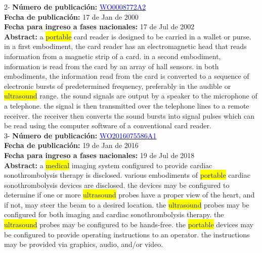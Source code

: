  \vspace{1cm}2- \textbf{Número de publicación:} \href{https://worldwide.espacenet.com/publicationDetails/biblio?DB=EPODOC&II=0&ND=3&adjacent=true&locale=en_EP&FT=D&date=20160331&CC=WO&NR=0008772A2&KC=#}{\textcolor{blue}{WO0008772A2}}\\ 
\textbf{Fecha de publicación:} 17 de Jan de 2000\\ 
\textbf{Fecha para ingreso a fases nacionales:} 17 de Jul de 2002\\ 
\textbf{Abstract:} a \colorbox{yellow}{\colorbox{yellow}{portable}} card reader is designed to be carried in a wallet or purse. in a first embodiment, the card reader has an electromagnetic head that reads information from a magnetic strip of a card. in a second embodiment, information is read from the card by an array of hall sensors. in both embodiments, the information read from the card is converted to a sequence of electronic bursts of predetermined frequency, preferably in the audible or \colorbox{yellow}{ultrasound} range. the sound signals are output by a speaker to the microphone of a telephone. the signal is then transmitted over the telephone lines to a remote receiver. the receiver then converts the sound bursts into signal pulses which can be read using the computer software of a conventional card reader.\\ 
 

 \vspace{1cm}3- \textbf{Número de publicación:} \href{https://worldwide.espacenet.com/publicationDetails/biblio?DB=EPODOC&II=0&ND=3&adjacent=true&locale=en_EP&FT=D&date=20160331&CC=WO&NR=2016075586A1&KC=A1#}{\textcolor{blue}{WO2016075586A1}}\\ 
\textbf{Fecha de publicación:} 19 de Jan de 2016\\ 
\textbf{Fecha para ingreso a fases nacionales:} 19 de Jul de 2018\\ 
\textbf{Abstract:} a \colorbox{yellow}{medical} imaging system configured to provide cardiac sonothrombolysis therapy is disclosed. various embodiments of \colorbox{yellow}{\colorbox{yellow}{portable}} cardiac sonothrombolysis devices are disclosed. the devices may be configured to determine if one or more \colorbox{yellow}{ultrasound} probes have a proper view of the heart, and if not, may steer the beam to a desired location. the \colorbox{yellow}{ultrasound} probes may be configured for both imaging and cardiac sonothrombolysis therapy. the \colorbox{yellow}{ultrasound} probes may be configured to be hands-free. the \colorbox{yellow}{\colorbox{yellow}{portable}} devices may be configured to provide operating instructions to an operator. the instructions may be provided via graphics, audio, and/or video.\\ 
 

